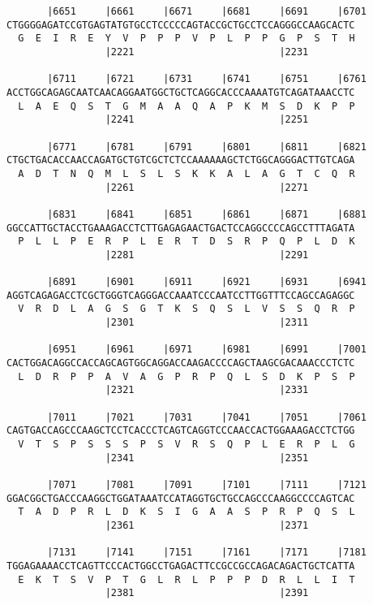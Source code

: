 \documentclass{article}
\begin{document}
\begin{Verbatim}
       |6651     |6661     |6671     |6681     |6691     |6701
CTGGGGAGATCCGTGAGTATGTGCCTCCCCCAGTACCGCTGCCTCCAGGGCCAAGCACTC
  G  E  I  R  E  Y  V  P  P  P  V  P  L  P  P  G  P  S  T  H
                 |2221                         |2231        
  
       |6711     |6721     |6731     |6741     |6751     |6761
ACCTGGCAGAGCAATCAACAGGAATGGCTGCTCAGGCACCCAAAATGTCAGATAAACCTC
  L  A  E  Q  S  T  G  M  A  A  Q  A  P  K  M  S  D  K  P  P
                 |2241                         |2251        
  
       |6771     |6781     |6791     |6801     |6811     |6821
CTGCTGACACCAACCAGATGCTGTCGCTCTCCAAAAAAGCTCTGGCAGGGACTTGTCAGA
  A  D  T  N  Q  M  L  S  L  S  K  K  A  L  A  G  T  C  Q  R
                 |2261                         |2271        
  
       |6831     |6841     |6851     |6861     |6871     |6881
GGCCATTGCTACCTGAAAGACCTCTTGAGAGAACTGACTCCAGGCCCCAGCCTTTAGATA
  P  L  L  P  E  R  P  L  E  R  T  D  S  R  P  Q  P  L  D  K
                 |2281                         |2291        
  
       |6891     |6901     |6911     |6921     |6931     |6941
AGGTCAGAGACCTCGCTGGGTCAGGGACCAAATCCCAATCCTTGGTTTCCAGCCAGAGGC
  V  R  D  L  A  G  S  G  T  K  S  Q  S  L  V  S  S  Q  R  P
                 |2301                         |2311        
  
       |6951     |6961     |6971     |6981     |6991     |7001
CACTGGACAGGCCACCAGCAGTGGCAGGACCAAGACCCCAGCTAAGCGACAAACCCTCTC
  L  D  R  P  P  A  V  A  G  P  R  P  Q  L  S  D  K  P  S  P
                 |2321                         |2331        
  
       |7011     |7021     |7031     |7041     |7051     |7061
CAGTGACCAGCCCAAGCTCCTCACCCTCAGTCAGGTCCCAACCACTGGAAAGACCTCTGG
  V  T  S  P  S  S  S  P  S  V  R  S  Q  P  L  E  R  P  L  G
                 |2341                         |2351        
  
       |7071     |7081     |7091     |7101     |7111     |7121
GGACGGCTGACCCAAGGCTGGATAAATCCATAGGTGCTGCCAGCCCAAGGCCCCAGTCAC
  T  A  D  P  R  L  D  K  S  I  G  A  A  S  P  R  P  Q  S  L
                 |2361                         |2371        
  
       |7131     |7141     |7151     |7161     |7171     |7181
TGGAGAAAACCTCAGTTCCCACTGGCCTGAGACTTCCGCCGCCAGACAGACTGCTCATTA
  E  K  T  S  V  P  T  G  L  R  L  P  P  P  D  R  L  L  I  T
                 |2381                         |2391        
  

\end{Verbatim}
\end{document}
